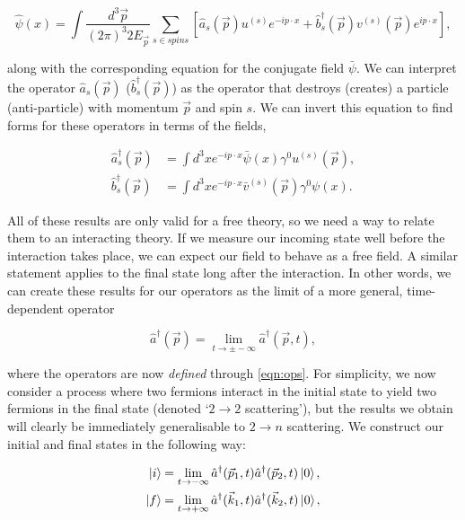 \begin{equation}
\hat{\psi}(x) = \int \frac{d^3 \vec{p}}{(2 \pi)^3 2 E_{\vec{p}}} \sum_{s \in spins} \left[\hat{a}_s(\vec{p}) u^{(s)} e^{-ip\cdot x} + \hat{b}_s^\dagger(\vec{p}) v^{(s)}(\vec{p})e^{i p \cdot x} \right],
\end{equation}

along with the corresponding equation for the conjugate field $\bar{\psi}$. We can interpret the operator $\hat{a}_s(\vec{p})$ ($\hat{b}^\dagger_s (\vec{p})$) as the operator that destroys (creates) a particle (anti-particle) with momentum $\vec{p}$ and spin $s$. We can invert this equation to find forms for these operators in terms of the fields,

\begin{subequations}
\label{eqn:ops}
\begin{align}
\hat{a}_s^\dagger (\vec{p}) & = \int d^3 x e^{-i p \cdot x} \bar{\psi}(x) \gamma^0 u^{(s)}(\vec{p}), \\
\hat{b}_s^\dagger (\vec{p}) & = \int d^3 x e^{- i p \cdot x} \bar{v}^{(s)}(\vec{p}) \gamma^0 \psi(x).
\end{align}
\end{subequations}

All of these results are only valid for a free theory, so we need a way to relate them to an interacting theory. If we measure our incoming state well before the interaction takes place, we can expect our field to behave as a free field. A similar statement applies to the final state long after the interaction. In other words, we can create these results for our operators as the limit of a more general, time-dependent operator

\begin{equation}
\hat{a}^\dagger(\vec{p}) = \lim_{t \to \pm -\infty} \hat{a}^\dagger(\vec{p}, t),
\end{equation}

where the operators are now \emph{defined} through \ref{eqn:ops}. For simplicity, we now consider a process where two fermions interact in the initial state to yield two fermions in the final state (denoted `$2\to2$ scattering'), but the results we obtain will clearly be immediately generalisable to $2 \to n$ scattering. We construct our initial and final states in the following way:

\begin{subequations}
\begin{align}
\mathinner{\lvert i\rangle}_{\hspace{-0.1em}} &= \lim_{t \to -\infty} \hat{a}^\dagger(\vec{p}_1,t) \hat{a}^\dagger(\vec{p}_2 ,t) \mathinner{\lvert0\rangle}_{\hspace{-0.1em}}, \\ 
\mathinner{\lvert f\rangle}_{\hspace{-0.1em}} &= \lim_{t \to +\infty} \hat{a}^\dagger(\vec{k}_1,t) \hat{a}^\dagger(\vec{k}_2 ,t) \mathinner{\lvert0\rangle}_{\hspace{-0.1em}},
\end{align}
\end{subequations}

